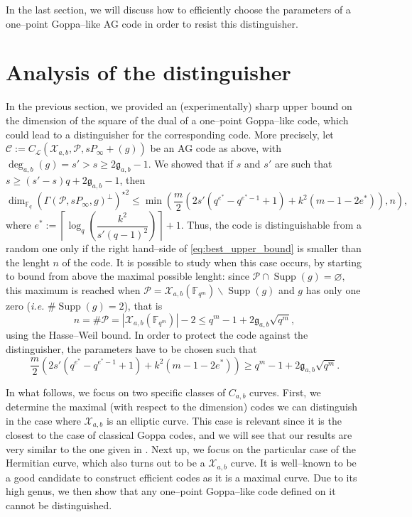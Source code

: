 \documentclass[a4paper]{amsart}
\theoremstyle{definition}
\theoremstyle{remark}
\newcommand{\calP}{\mathcal{P}}
\newcommand{\calL}{\mathcal{L}}
\newcommand{\calC}{\mathcal{C}}
\newcommand{\calX}{\mathcal{X}}
\newcommand{\fqm}{\mathbb{F}_{q^m}}
\newcommand{\fq}{\mathbb{F}_{q}}
\newcommand{\Supp}{\operatorname{Supp}}
\newcommand{\degab}[1]{\deg_{a,b}\left(#1\right)}
\begin{document}
In the last section, we will discuss how to efficiently choose the parameters of a one--point Goppa--like AG code in order to resist this distinguisher.

\section{Analysis of the distinguisher}\label{sec:analysis}

In the previous section, we provided an (experimentally) sharp upper bound on the dimension of the square of the dual of a one--point Goppa--like code, which could lead to a distinguisher for the corresponding code. More precisely, let $\calC := C_\calL(\calX_{a,b},\calP,sP_\infty +(g))$ be an AG code as above, with $\degab{g} = s'>s\geq 2\mathfrak{g}_{a,b}-1$. We showed that if $s$ and $s'$ are such that $s \geq (s'-s)q+2\mathfrak{g}_{a,b}-1$, then
\begin{equation} \label{eq:best_upper_bound}
\dim_{\fq} (\Gamma(\calP,sP_\infty,g)^{\perp})^{\star 2} \leq \min \left(\frac{m}{2}\left(2s'(q^{e^*}-q^{e^*-1}+1)+k^2(m-1-2e^*)  \right),n\right),
\end{equation}
where $e^* := \left\lceil \log_q\left(\dfrac{k^2}{s'(q-1)^2}\right)\right\rceil+1$. Thus, the code is distinguishable from a random one only if the right hand--side of \eqref{eq:best_upper_bound} is smaller than the lenght $n$ of the code. It is possible to study when this case occurs, by starting to bound from above the maximal possible lenght: since $\calP \cap \Supp(g) = \varnothing,$ this maximum is reached when $\calP = \calX_{a,b}(\fqm) \backslash \Supp(g)$ and $g$ has only one zero (\emph{i.e.} $\#\Supp(g)=2$), that is
$$n = \# \calP = |\calX_{a,b}(\fqm)|-2 \leq q^m-1+2\mathfrak{g}_{a,b}\sqrt{q^m},$$
using the Hasse--Weil bound. In order to protect the code against the distinguisher, the parameters have to be chosen such that 
\begin{equation} \label{eq:cond_not_to_distinguish}
\frac{m}{2}\left(2s'(q^{e^*}-q^{e^*-1}+1)+k^2(m-1-2e^*)  \right)\geq q^m-1+2\mathfrak{g}_{a,b}\sqrt{q^m}.
\end{equation}

In what follows, we focus on two specific classes of $C_{a,b}$ curves. First, we determine the maximal (with respect to the dimension) codes we can distinguish in the case where $\calX_{a,b}$ is an elliptic curve. This case is relevant since it is the closest to the case of classical Goppa codes, and we will see that our results are very similar to the one given in \cite{MT21}. Next up, we focus on the particular case of the Hermitian curve, which also turns out to be a $\calX_{a,b}$ curve. It is well--known to be a good candidate to construct efficient codes as it is a maximal curve. Due to its high genus, we then show that any one--point Goppa--like code defined on it cannot be distinguished.
\end{document}
